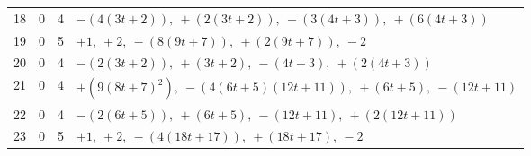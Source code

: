 {\begin{longtable}{@{}rcrp{}@{}}
18 & 0 & 4 & $-(4 \left(3 t + 2\right)),\ +(2 \left(3 t + 2\right)),\ -(3 \left(4 t + 3\right)),\ +(6 \left(4 t + 3\right))$ \\
19 & 0 & 5 & $+1,\ +2,\ -(8 \left(9 t + 7\right)),\ +(2 \left(9 t + 7\right)),\ -2$ \\
20 & 0 & 4 & $-(2 \left(3 t + 2\right)),\ +(3 t + 2),\ -(4 t + 3),\ +(2 \left(4 t + 3\right))$ \\
21 & 0 & 4 & $+(9 \left(8 t + 7\right)^{2}),\ -(4 \left(6 t + 5\right) \left(12 t + 11\right)),\ +(6 t + 5),\ -(12 t + 11)$ \\
22 & 0 & 4 & $-(2 \left(6 t + 5\right)),\ +(6 t + 5),\ -(12 t + 11),\ +(2 \left(12 t + 11\right))$ \\
23 & 0 & 5 & $+1,\ +2,\ -(4 \left(18 t + 17\right)),\ +(18 t + 17),\ -2$ \\
\bottomrule\end{longtable}}
